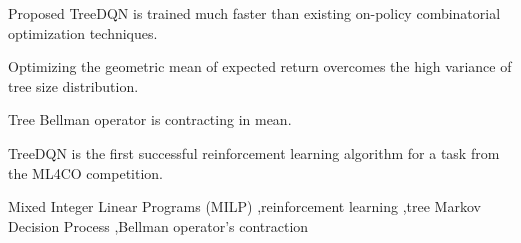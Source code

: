 \documentclass[preprint,12pt]{elsarticle} %
\theoremstyle{plain}
\theoremstyle{definition}
\theoremstyle{remark}
\begin{document}
\begin{frontmatter}
\begin{abstract}
A convenient approach to optimally solving combinatorial optimization tasks is the Branch-and-Bound method. Its branching heuristic can be learned to solve a large set of similar tasks. The promising results here are achieved by the recently appeared on-policy reinforcement learning method based on the tree Markov Decision Process. To overcome its main disadvantages, namely, very large training time and unstable training, we propose TreeDQN (Tree Deep Q-Network), a sample-efficient off-policy RL method trained by optimizing the geometric mean of expected return. To theoretically support the training procedure for our method, we prove the contraction property of the Bellman operator for the tree MDP. As a result, our method requires up to 10 times less training data and performs faster than known on-policy methods on synthetic tasks. Moreover, TreeDQN significantly outperforms the state-of-the-art techniques on a challenging practical task from the ML4CO competition. 
\end{abstract}


\begin{highlights}
\item Proposed TreeDQN is trained much faster than existing on-policy combinatorial optimization techniques.
\item Optimizing the geometric mean of expected return overcomes the high variance of tree size distribution.
\item Tree Bellman operator is contracting in mean.
\item TreeDQN is the first successful reinforcement learning algorithm for a task from the ML4CO competition.
\end{highlights}

\begin{keyword}
Mixed Integer Linear Programs (MILP) \sep reinforcement learning  \sep tree Markov Decision Process \sep Bellman operator's contraction



\end{keyword}

\end{frontmatter}
\end{document}
